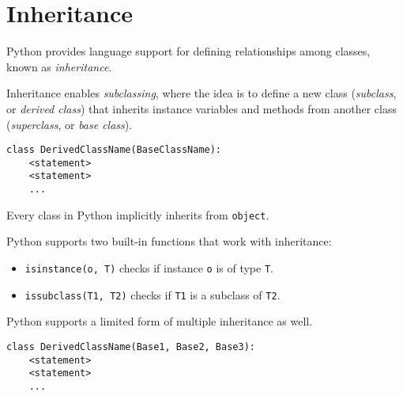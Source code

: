 \documentclass[8pt,a4paper,compress,handout]{beamer}
\begin{document}
\section{Inheritance}
\begin{frame}[fragile]
Python provides language support for defining relationships among classes, known as \emph{inheritance}.

\bigskip

Inheritance enables \emph{subclassing}, where the idea is to define a new class (\emph{subclass}, or \emph{derived class}) that inherits instance variables and methods from another class (\emph{superclass}, or \emph{base class}). 

\begin{lstlisting}[language={}]
class DerivedClassName(BaseClassName):
    <statement>
    <statement>
    ...
\end{lstlisting}

\bigskip

Every class in Python implicitly inherits from \lstinline{object}.

\bigskip

Python supports two built-in functions that work with inheritance:
\begin{itemize}
\item \lstinline{isinstance(o, T)} checks if instance \lstinline{o} is of type \lstinline{T}.
\item \lstinline{issubclass(T1, T2)} checks if \lstinline{T1} is a subclass of \lstinline{T2}.
\end{itemize}

\bigskip

Python supports a limited form of multiple inheritance as well. 

\begin{lstlisting}[language={}]
class DerivedClassName(Base1, Base2, Base3):
    <statement>
    <statement>
    ...
\end{lstlisting}
\end{frame}
\end{document}
